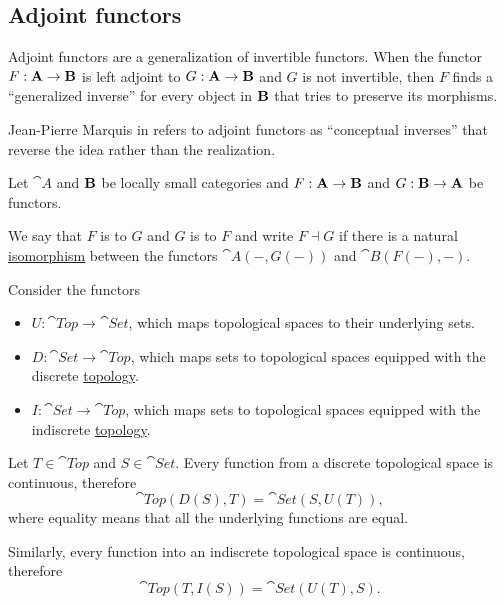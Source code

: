 \subsection{Adjoint functors}\label{subsec:adjoint_functors}

\begin{remark}\label{def:adjoint_functors}
  Adjoint functors are a generalization of invertible functors. When the functor \( F: \operatorname{\mathbf{A}} \to \operatorname{\mathbf{B}} \) is left adjoint to \( G: \operatorname{\mathbf{A}} \to \operatorname{\mathbf{B}} \) and \( G \) is not invertible, then \( F \) finds a \enquote{generalized inverse} for every object in \( \operatorname{\mathbf{B}} \) that tries to preserve its morphisms.

  Jean-Pierre Marquis in \cite{StanfordPlato:category_theory} refers to adjoint functors as \enquote{conceptual inverses} that reverse the idea rather than the realization.
\end{remark}

\begin{definition}\label{def:adjoint_functor}
  Let \( \cat{A} \) and \( \operatorname{\mathbf{B}} \) be locally small categories and \( F: \operatorname{\mathbf{A}} \to \operatorname{\mathbf{B}} \) and \( G: \operatorname{\mathbf{B}} \to \operatorname{\mathbf{A}} \) be functors.

  We say that \( F \) is  to \( G \) and \( G \) is  to \( F \) and write \( F \dashv G \) if there is a natural \hyperref[def:natural_isomorpism]{isomorphism} between the functors \( \cat{A}(-, G(-)) \) and \( \cat{B}(F(-), -) \).
\end{definition}

\begin{example}\label{ex:top_adjoint_functor}
  Consider the functors
  \begin{itemize}
    \item \( U: \cat{Top} \to \cat{Set} \), which maps topological spaces to their underlying sets.
    \item \( D: \cat{Set} \to \cat{Top} \), which maps sets to topological spaces equipped with the discrete \hyperref[def:standard_topologies/discrete]{topology}.
    \item \( I: \cat{Set} \to \cat{Top} \), which maps sets to topological spaces equipped with the indiscrete \hyperref[def:standard_topologies/indiscrete]{topology}.
  \end{itemize}

  Let \( T \in \cat{Top} \) and \( S \in \cat{Set} \). Every function from a discrete topological space is continuous, therefore
  \begin{equation*}
    \cat{Top}(D(S), T) = \cat{Set}(S, U(T)),
  \end{equation*}
  where equality means that all the underlying functions are equal.

  Similarly, every function into an indiscrete topological space is continuous, therefore
  \begin{equation*}
    \cat{Top}(T, I(S)) = \cat{Set}(U(T), S).
  \end{equation*}
\end{example}
